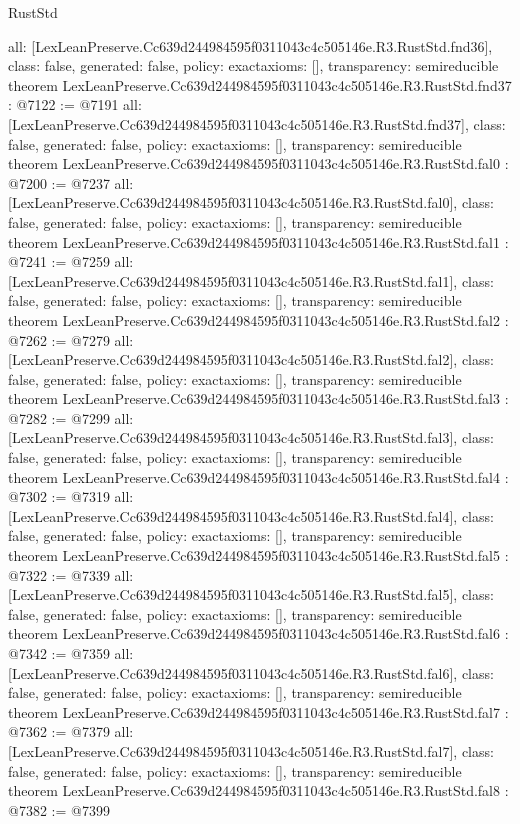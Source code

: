 \begin{lexlean}{RustStd}
\begin{coremodule}
{  all: [LexLeanPreserve.Cc639d244984595f0311043c4c505146e.R3.RustStd.fnd36],
  class: false,
  generated: false,
  policy: exact{axioms: []},
  transparency: semireducible
}
theorem LexLeanPreserve.Cc639d244984595f0311043c4c505146e.R3.RustStd.fnd37 : @7122 := @7191 {
  all: [LexLeanPreserve.Cc639d244984595f0311043c4c505146e.R3.RustStd.fnd37],
  class: false,
  generated: false,
  policy: exact{axioms: []},
  transparency: semireducible
}
theorem LexLeanPreserve.Cc639d244984595f0311043c4c505146e.R3.RustStd.fal0 : @7200 := @7237 {
  all: [LexLeanPreserve.Cc639d244984595f0311043c4c505146e.R3.RustStd.fal0],
  class: false,
  generated: false,
  policy: exact{axioms: []},
  transparency: semireducible
}
theorem LexLeanPreserve.Cc639d244984595f0311043c4c505146e.R3.RustStd.fal1 : @7241 := @7259 {
  all: [LexLeanPreserve.Cc639d244984595f0311043c4c505146e.R3.RustStd.fal1],
  class: false,
  generated: false,
  policy: exact{axioms: []},
  transparency: semireducible
}
theorem LexLeanPreserve.Cc639d244984595f0311043c4c505146e.R3.RustStd.fal2 : @7262 := @7279 {
  all: [LexLeanPreserve.Cc639d244984595f0311043c4c505146e.R3.RustStd.fal2],
  class: false,
  generated: false,
  policy: exact{axioms: []},
  transparency: semireducible
}
theorem LexLeanPreserve.Cc639d244984595f0311043c4c505146e.R3.RustStd.fal3 : @7282 := @7299 {
  all: [LexLeanPreserve.Cc639d244984595f0311043c4c505146e.R3.RustStd.fal3],
  class: false,
  generated: false,
  policy: exact{axioms: []},
  transparency: semireducible
}
theorem LexLeanPreserve.Cc639d244984595f0311043c4c505146e.R3.RustStd.fal4 : @7302 := @7319 {
  all: [LexLeanPreserve.Cc639d244984595f0311043c4c505146e.R3.RustStd.fal4],
  class: false,
  generated: false,
  policy: exact{axioms: []},
  transparency: semireducible
}
theorem LexLeanPreserve.Cc639d244984595f0311043c4c505146e.R3.RustStd.fal5 : @7322 := @7339 {
  all: [LexLeanPreserve.Cc639d244984595f0311043c4c505146e.R3.RustStd.fal5],
  class: false,
  generated: false,
  policy: exact{axioms: []},
  transparency: semireducible
}
theorem LexLeanPreserve.Cc639d244984595f0311043c4c505146e.R3.RustStd.fal6 : @7342 := @7359 {
  all: [LexLeanPreserve.Cc639d244984595f0311043c4c505146e.R3.RustStd.fal6],
  class: false,
  generated: false,
  policy: exact{axioms: []},
  transparency: semireducible
}
theorem LexLeanPreserve.Cc639d244984595f0311043c4c505146e.R3.RustStd.fal7 : @7362 := @7379 {
  all: [LexLeanPreserve.Cc639d244984595f0311043c4c505146e.R3.RustStd.fal7],
  class: false,
  generated: false,
  policy: exact{axioms: []},
  transparency: semireducible
}
theorem LexLeanPreserve.Cc639d244984595f0311043c4c505146e.R3.RustStd.fal8 : @7382 := @7399 {
}
\end{coremodule}
\end{lexlean}
